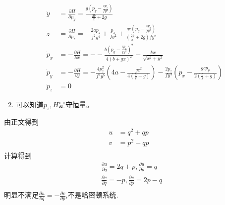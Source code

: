 \begin{solution}
\begin{enumerate}[label=(\arabic*)]
\begin{align*}
        \dot y&=\frac{\partial H}{\partial p_y}=\frac{g(p_y-\frac{cp_z}{fy^2})}{\frac{2b}{x}+2g}\\
        \dot z&=\frac{\partial H}{\partial p_z}=-\frac{2ap_z}{f^2y^4}+\frac{p_x}{fy^2}+\frac{gc(p_y-\frac{cp_z}{fy^2})}{(\frac{2b}{x}+2g)fy^2}\\
        \dot p_x&=-\frac{\partial H}{\partial x}=--\frac{b(p_y-\frac{cp_z}{fy^2})^2}{4(b+gx)^2}-\frac{kx}{\sqrt{x^2+y^2}}\\
        \dot p_y&=-\frac{\partial H}{\partial y}=-\frac{4p_z^2}{f^2y^5}(4a-\frac{gc^2}{4(\frac bx+g)})-\frac{2p_z}{fy^3}(p_x-\frac{gcp_y}{2(\frac{b}{x}+g)})\\
        \dot p_z&=0
    \end{align*}
    \item 可以知道$p_z,H$是守恒量。
    \end{enumerate}
\end{solution}
\begin{solution}
    由正文得到
    \begin{align*}
        u&=q^2+qp\\
        v&=p^2-qp\\
    \end{align*}
    计算得到
    \begin{align*}
        &\frac{\partial u}{\partial q}=2q+p,\frac{\partial u}{\partial p}=q\\
        &\frac{\partial v}{\partial q}=-p,\frac{\partial v}{\partial p}=2p-q\\
    \end{align*}
    明显不满足$\frac{\partial u}{\partial q}=-\frac{\partial v}{\partial p}$,不是哈密顿系统.
\end{solution}
